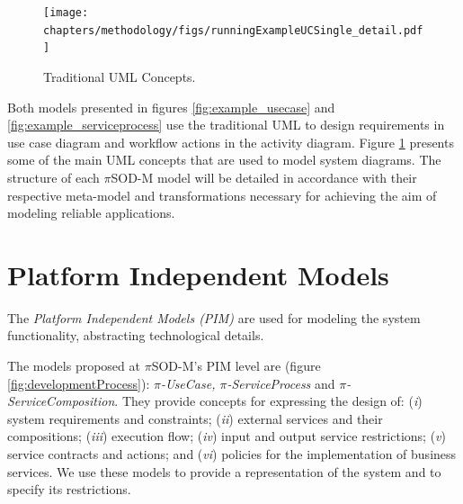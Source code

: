 \begin{figure}[ht!] 
\centering
\texttt{[image: chapters/methodology/figs/runningExampleUCSingle\_detail.pdf]}
\caption{Traditional UML Concepts.}
\label{fig:umlConcepts} 
\end{figure}

Both models presented in figures \ref{fig:example_usecase} and \ref{fig:example_serviceprocess} use the
 traditional UML to design requirements in use case diagram and workflow actions
in the activity diagram. Figure \ref{fig:umlConcepts} presents
some of the main UML concepts that are used to model system diagrams. The
structure of each $\pi$SOD-M model will be detailed in accordance with their
respective meta-model and transformations necessary for achieving the aim of modeling
reliable applications.  
 

\section{Platform Independent Models}
\label{sec:pim-pisodm}


The \textit{Platform Independent Models (PIM)} are used for modeling the
system functionality, abstracting technological details. 


The models proposed at $\pi$SOD-M's PIM level are (figure
\ref{fig:developmentProcess}): \textit{ $\pi$-UseCase, $\pi$-ServiceProcess} and \textit{
$\pi$-ServiceComposition}. They provide concepts for expressing the design of:
(\textit{i}) system requirements and constraints; (\textit{ii}) external
services and their compositions; (\textit{iii}) execution flow; (\textit{iv})
input and output service restrictions; (\textit{v}) service contracts and
actions; and (\textit{vi}) policies for the implementation of business services.
We use these models to provide a representation of the system and to
specify its restrictions. 



